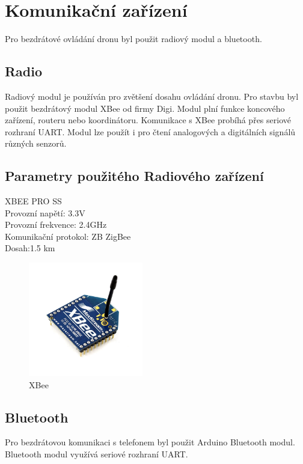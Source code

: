 \section{Komunikační zařízení} 
Pro bezdrátové ovládání dronu byl použit radiový modul a bluetooth.\\
\subsection{Radio} 
Radiový modul je používán pro zvětšení dosahu ovládání dronu. Pro stavbu byl použit bezdrátový modul XBee od firmy Digi. Modul plní funkce koncového zařízení, routeru nebo koordinátoru. Komunikace s XBee probíhá přes seriové rozhraní UART. Modul lze použít i pro čtení analogových a digitálních signálů různých senzorů.\\
\subsection{Parametry použitého Radiového zařízení}
XBEE PRO SS\\
Provozní napětí: 3.3V\\
Provozní frekvence: 2.4GHz\\
Komunikační protokol: ZB ZigBee\\
Dosah:1.5 km\\

\begin{figure}[h]
	\centering
	\includegraphics[width=5cm]{pictures/xbee.jpg}
	\caption{XBee}
\end{figure}

\subsection{Bluetooth} 
Pro bezdrátovou komunikaci s telefonem byl použit Arduino Bluetooth modul. Bluetooth modul využívá seriové rozhraní UART.\\

